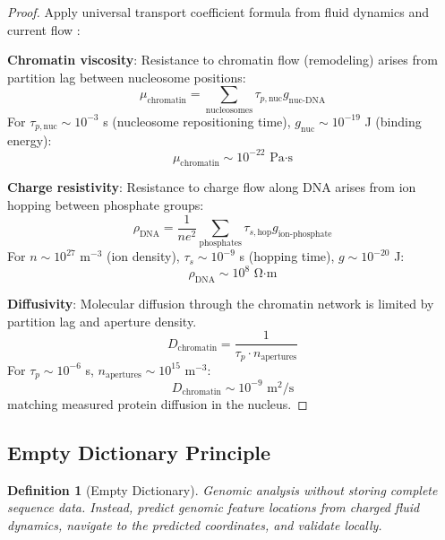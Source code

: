 \documentclass[11pt,a4paper]{article}
\newtheorem{definition}[theorem]{Definition}
\theoremstyle{remark}
\begin{document}
\begin{proof}
Apply universal transport coefficient formula from fluid dynamics \citep{Sachikonye2025_Fluid} and current flow \citep{Sachikonye2025_Current}:

\textbf{Chromatin viscosity}: Resistance to chromatin flow (remodeling) arises from partition lag between nucleosome positions:
\begin{equation}
\mu_{\text{chromatin}} = \sum_{\text{nucleosomes}} \tau_{p,\text{nuc}} g_{\text{nuc-DNA}}
\end{equation}
For $\tau_{p,\text{nuc}} \sim 10^{-3}$ s (nucleosome repositioning time), $g_{\text{nuc}} \sim 10^{-19}$ J (binding energy):
\begin{equation}
\mu_{\text{chromatin}} \sim 10^{-22} \text{ Pa·s}
\end{equation}

\textbf{Charge resistivity}: Resistance to charge flow along DNA arises from ion hopping between phosphate groups:
\begin{equation}
\rho_{\text{DNA}} = \frac{1}{ne^2}\sum_{\text{phosphates}} \tau_{s,\text{hop}} g_{\text{ion-phosphate}}
\end{equation}
For $n \sim 10^{27}$ m$^{-3}$ (ion density), $\tau_s \sim 10^{-9}$ s (hopping time), $g \sim 10^{-20}$ J:
\begin{equation}
\rho_{\text{DNA}} \sim 10^8 \text{ Ω·m}
\end{equation}

\textbf{Diffusivity}: Molecular diffusion through the chromatin network is limited by partition lag and aperture density.
\begin{equation}
D_{\text{chromatin}} = \frac{1}{\tau_p \cdot n_{\text{apertures}}}
\end{equation}
For $\tau_p \sim 10^{-6}$ s, $n_{\text{apertures}} \sim 10^{15}$ m$^{-3}$:
\begin{equation}
D_{\text{chromatin}} \sim 10^{-9} \text{ m}^2\text{/s}
\end{equation}
matching measured protein diffusion in the nucleus.
\end{proof}

\subsection{Empty Dictionary Principle}

\begin{definition}[Empty Dictionary]
\label{def:empty_dictionary}
Genomic analysis without storing complete sequence data. Instead, predict genomic feature locations from charged fluid dynamics, navigate to the predicted coordinates, and validate locally.
\end{definition}
\end{document}
